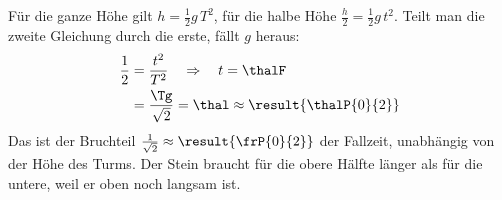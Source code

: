 Für die ganze Höhe gilt $h = \frac{1}{2}g\,T^2$, für die halbe Höhe $\frac{h}{2} = \frac{1}{2}g\,t^2$. Teilt man die zweite Gleichung durch die erste, fällt $g$ heraus:
\begin{align}
 \frac{1}{2} &= \frac{t^2}{T^2} \quad\Rightarrow\quad t = \thalF \\
   &= \frac{\Tg}{\sqrt{2}} = \thal \approx \result{\thalP{0}{2}}
\end{align}
Das ist der Bruchteil $\frac{1}{\sqrt{2}} \approx \result{\frP{0}{2}}$ der Fallzeit, unabhängig von der Höhe des Turms. Der Stein braucht für die obere Hälfte länger als für die untere, weil er oben noch langsam ist.
